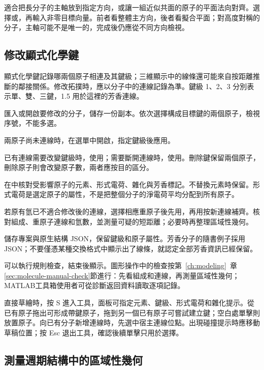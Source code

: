 適合把長分子的主軸放到指定方向，或讓一組近似共面的原子的平面法向對齊。選擇或，再輸入非零目標向量。前者看整體主方向，後者看擬合平面；對高度對稱的分子，主軸可能不是唯一的，完成後仍應從不同方向檢視。

\subsection{修改顯式化學鍵}\label{sec:bond-edit-reference}

顯式化學鍵記錄哪兩個原子相連及其鍵級；三維顯示中的線條還可能來自按距離推斷的鄰接關係。修改拓撲時，應以分子中的連線記錄為準。鍵級 1、2、3 分別表示單、雙、三鍵，1.5 用於這裡的芳香連線。

\begin{steps}
  \item 匯入或開啟要修改的分子，儲存一份副本。依次選擇構成目標鍵的兩個原子，檢視序號，不能多選。
  \item 兩原子尚未連線時，在選單中開啟，指定鍵級後應用。
  \item 已有連線需要改變鍵級時，使用；需要斷開連線時，使用。刪除鍵保留兩個原子，刪除原子則會改變原子數，兩者應按目的區分。
  \item 在中核對受影響原子的元素、形式電荷、雜化與芳香標記。不替換元素時保留。形式電荷是選定原子的屬性，不是把整個分子的淨電荷平均分配到所有原子。
  \item 若原有氫已不適合修改後的連線，選擇相應重原子後先用，再用按新連線補齊。核對組成、重原子連線和氫數，並測量可疑的短距離；必要時再整理區域性幾何。
  \item 儲存專案與原生結構 JSON，保留鍵級和原子屬性。芳香分子的隨書例子採用 JSON；不要僅憑某種交換格式中顯示出了線條，就認定全部芳香資訊已經保留。
\end{steps}

可以執行規則檢查，結束後顯示。圖形操作中的檢查按第~\ref{ch:modeling}~章\ref{sec:molecule-manual-check}節進行：先看組成和連線，再測量區域性幾何；MATLAB\regmark{}工具箱使用者可從診斷返回資料讀取逐項記錄。

直接草繪時，按 S 進入工具，面板可指定元素、鍵級、形式電荷和雜化提示。從已有原子拖出可形成帶鍵原子，拖到另一個已有原子可嘗試建立鍵；空白處單擊則放置原子。向已有分子新增連線時，先選中宿主連線位點。出現碰撞提示時應移動草稿位置；按 Esc 退出工具，確認後續單擊只用於選擇。

\subsection{測量週期結構中的區域性幾何}\label{sec:periodic-measure-reference}

